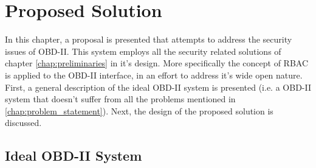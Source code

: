 \chapter{Proposed Solution}
\label{chap:solution}

In this chapter, a proposal is presented that attempts to address the security issues of OBD-II. This system employs all the security related solutions of chapter \ref{chap:preliminaries} in it's design. More specifically the concept of RBAC is applied to the OBD-II interface, in an effort to address it's wide open nature. First, a general description of the ideal OBD-II system is presented (i.e. a OBD-II system that doesn't suffer from all the problems mentioned in \ref{chap:problem_statement}). Next, the design of the proposed solution is discussed.

\section{Ideal OBD-II System}
\label{sec:sol_RBAC}


